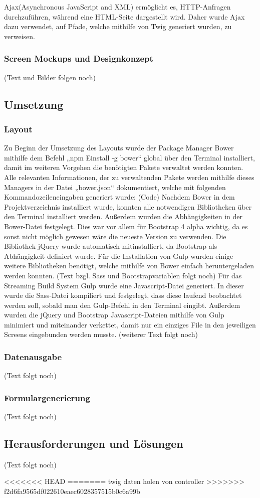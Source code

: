 Ajax(Asynchronous JavaScript and XML) ermöglicht es, HTTP-Anfragen durchzuführen, während eine HTML-Seite dargestellt wird. Daher wurde Ajax dazu verwendet, auf Pfade, welche mithilfe von Twig generiert wurden, zu verweisen.
    
    \subsubsection{Screen Mockups und Designkonzept}

(Text und Bilder folgen noch)

  \subsection{Umsetzung}

    \subsubsection{Layout}

Zu Beginn der Umsetzung des Layouts wurde der Package Manager Bower mithilfe dem Befehl „npm Einstall -g bower“ global über den Terminal installiert, damit im weiteren Vorgehen die benötigten Pakete verwaltet werden konnten. Alle relevanten Informationen, der zu verwaltenden Pakete werden mithilfe dieses Managers in der Datei „bower.json“ dokumentiert, welche mit folgenden Kommandozeileneingaben generiert wurde:
(Code)
Nachdem Bower in dem Projektverzeichnis installiert wurde, konnten alle notwendigen Bibliotheken über den Terminal installiert werden. Außerdem wurden die Abhängigkeiten in der Bower-Datei festgelegt. Dies war vor allem für Bootstrap 4 alpha wichtig, da es sonst nicht möglich gewesen wäre die neueste Version zu verwenden. Die Bibliothek jQuery wurde automatisch mitinstalliert, da Bootstrap als Abhängigkeit definiert wurde. Für die Installation von Gulp wurden einige weitere Bibliotheken benötigt, welche mithilfe von Bower einfach heruntergeladen werden konnten. 
(Text bzgl. Sass und Bootstrapvariablen folgt noch)
Für das Streaming Build System Gulp wurde eine Javascript-Datei generiert. In dieser wurde die Sass-Datei kompiliert und festgelegt, dass diese laufend beobachtet werden soll, sobald man den Gulp-Befehl in den Terminal eingibt. Außerdem wurden die jQuery und Bootstrap Javascript-Dateien mithilfe von Gulp minimiert und miteinander verkettet, damit nur ein einziges File in den jeweiligen Screens eingebunden werden musste.
(weiterer Text folgt noch)

    \subsubsection{Datenausgabe}

(Text folgt noch)

    \subsubsection{Formulargenerierung}

(Text folgt noch)

  \subsection{Herausforderungen und Lösungen}
  
(Text folgt noch)


<<<<<<< HEAD
=======
twig daten holen von controller
>>>>>>> f2d6fa9565df022610eaec6028357515b0c6a99b
